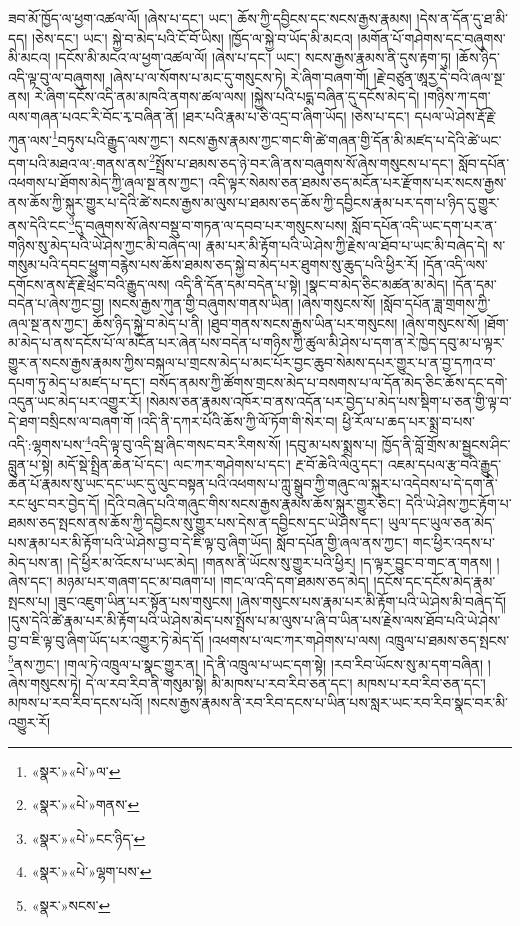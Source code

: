 ཟབ་མོ་ཁྱོད་ལ་ཕྱག་འཚལ་ལོ། །ཞེས་པ་དང་། ཡང་། ཆོས་ཀྱི་དབྱིངས་དང་སངས་རྒྱས་རྣམས། །དེས་ན་དོན་དུ་ཐ་མི་དད། །ཅེས་དང་། ཡང་། སྐྱེ་བ་མེད་པའི་ངོ་བོ་ཡིས། །ཁྱོད་ལ་སྐྱེ་བ་ཡོད་མི་མངའ། །མགོན་པོ་གཤེགས་དང་བཞུགས་མི་མངའ། །དངོས་མི་མངའ་ལ་ཕྱག་འཚལ་ལོ། །ཞེས་པ་དང་། ཡང་། སངས་རྒྱས་རྣམས་ནི་དུས་རྟག་ཏུ། །ཆོས་ཉིད་འདི་ལྟ་བུ་ལ་བཞུགས། །ཞེས་པ་ལ་སོགས་པ་མང་དུ་གསུངས་ཏེ། རེ་ཞིག་བཞག་གོ། །རྗེ་བཙུན་ཨཱརྱ་དེ་བའི་ཞལ་སྔ་ནས། རེ་ཞིག་དངོས་འདི་ནམ་མཁའི་ནགས་ཚལ་ལས། །སྐྱེས་པའི་པདྨ་བཞིན་དུ་དངོས་མེད་དེ། །གཉིས་ཀ་དག་ལས་གཞན་པའང་རི་བོང་རྭ་བཞིན་ནོ། །ཐར་པའི་རྣམ་པ་ཅི་འདྲ་བ་ཞིག་ཡོད། །ཅེས་པ་དང་། དཔལ་ཡེ་ཤེས་རྡོ་རྗེ་ཀུན་ལས་\footnote{«སྣར་»«པེ་»ལ་}བཏུས་པའི་རྒྱུད་ལས་ཀྱང་། སངས་རྒྱས་རྣམས་ཀྱང་གང་གི་ཚེ་གཞན་གྱི་དོན་མི་མཛད་པ་དེའི་ཚེ་ཡང་དག་པའི་མཐའ་ལ་:གནས་ནས་\footnote{«སྣར་»«པེ་»གནས་}སྤྲོས་པ་ཐམས་ཅད་ཉེ་བར་ཞི་ནས་བཞུགས་སོ་ཞེས་གསུངས་པ་དང་། སློབ་དཔོན་འཕགས་པ་ཐོགས་མེད་ཀྱི་ཞལ་སྔ་ནས་ཀྱང་། འདི་ལྟར་སེམས་ཅན་ཐམས་ཅད་མངོན་པར་རྫོགས་པར་སངས་རྒྱས་ནས་ཆོས་ཀྱི་སྐུར་གྱུར་པ་དེའི་ཚེ་སངས་རྒྱས་མ་ལུས་པ་ཐམས་ཅད་ཆོས་ཀྱི་དབྱིངས་རྣམ་པར་དག་པ་ཉིད་དུ་གྱུར་ནས་དེའི་ངང་\footnote{«སྣར་»«པེ་»ངང་ཉིད་}དུ་བཞུགས་སོ་ཞེས་བསྡུ་བ་གཏན་ལ་དབབ་པར་གསུངས་པས། སློབ་དཔོན་འདི་ཡང་དག་པར་ན་གཉིས་སུ་མེད་པའི་ཡེ་ཤེས་ཀྱང་མི་བཞེད་ལ། རྣམ་པར་མི་རྟོག་པའི་ཡེ་ཤེས་ཀྱི་རྗེས་ལ་ཐོབ་པ་ཡང་མི་བཞེད་དེ། ས་གསུམ་པའི་དབང་ཕྱུག་བརྙེས་པས་ཆོས་ཐམས་ཅད་སྐྱེ་བ་མེད་པར་ཐུགས་སུ་ཆུད་པའི་ཕྱིར་རོ། །དོན་འདི་ལས་དགོངས་ནས་རྡོ་རྗེ་ཕྲེང་བའི་རྒྱུད་ལས། འདི་ནི་དོན་དམ་བདེན་པ་སྟེ། །སྣང་བ་མེད་ཅིང་མཚན་མ་མེད། །དོན་དམ་བདེན་པ་ཞེས་ཀྱང་བྱ། །སངས་རྒྱས་ཀུན་གྱི་བཞུགས་གནས་ཡིན། །ཞེས་གསུངས་སོ། །སློབ་དཔོན་ཟླ་གྲགས་ཀྱི་ཞལ་སྔ་ནས་ཀྱང་། ཆོས་ཉིད་སྐྱེ་བ་མེད་པ་ནི། །ཐུབ་གནས་སངས་རྒྱས་ཡིན་པར་གསུངས། །ཞེས་གསུངས་སོ། །ཐོག་མ་མེད་པ་ནས་དངོས་པོ་ལ་མངོན་པར་ཞེན་པས་བདེན་པ་གཉིས་ཀྱི་ཚུལ་མི་ཤེས་པ་དག་ན་རེ་ཁྱེད་དབུ་མ་པ་ལྟར་གྱུར་ན་སངས་རྒྱས་རྣམས་ཀྱིས་བསྐལ་པ་གྲངས་མེད་པ་མང་པོར་བྱང་ཆུབ་སེམས་དཔར་གྱུར་པ་ན་བྱ་དཀའ་བ་དཔག་ཏུ་མེད་པ་མཛད་པ་དང་། བསོད་ནམས་ཀྱི་ཚོགས་གྲངས་མེད་པ་བསགས་པ་ལ་དོན་མེད་ཅིང་ཆོས་དང་དགེ་འདུན་ཡང་མེད་པར་འགྱུར་རོ། །སེམས་ཅན་རྣམས་འཁོར་བ་ནས་འདོན་པར་བྱེད་པ་མེད་པས་སྡིག་པ་ཅན་གྱི་ལྟ་བ་དེ་ཐག་བསྲིངས་ལ་བཞག་གོ །འདི་ནི་དཀར་པོའི་ཆོས་ཀྱི་ལོ་ཏོག་གི་སེར་བ། ཕྱི་རོལ་པ་ཆད་པར་སྨྲ་བ་པས་འདི་:ལྷགས་པས་\footnote{«སྣར་»«པེ་»ལྷག་པས་}འདི་ལྟ་བུ་འདི་སྦ་ཞིང་གསང་བར་རིགས་སོ། །དབུ་མ་པས་སྨྲས་པ། ཁྱོད་ནི་བློ་གྲོས་མ་སྦྱངས་ཤིང་བླུན་པ་སྟེ། མདོ་སྡེ་སྤྲིན་ཆེན་པོ་དང་། ལང་ཀར་གཤེགས་པ་དང་། རྔ་བོ་ཆེའི་ལེའུ་དང་། འཇམ་དཔལ་རྩ་བའི་རྒྱུད་ཆེན་པོ་རྣམས་སུ་ཡང་དང་ཡང་དུ་ལུང་བསྟན་པའི་འཕགས་པ་ཀླུ་སྒྲུབ་ཀྱི་གཞུང་ལ་སྐུར་པ་འདེབས་པ་དེ་དག་ནི་རང་ཕུང་བར་བྱེད་དོ། །དེའི་བཞེད་པའི་གཞུང་གིས་སངས་རྒྱས་རྣམས་ཆོས་སྐུར་གྱུར་ཅིང་། དེའི་ཡེ་ཤེས་ཀྱང་རྟོག་པ་ཐམས་ཅད་སྤངས་ནས་ཆོས་ཀྱི་དབྱིངས་སུ་གྱུར་པས་དེས་ན་དབྱིངས་དང་ཡེ་ཤེས་དང་། ཡུལ་དང་ཡུལ་ཅན་མེད་པས་རྣམ་པར་མི་རྟོག་པའི་ཡེ་ཤེས་བྱ་བ་དེ་ཇི་ལྟ་བུ་ཞིག་ཡོད། སློབ་དཔོན་གྱི་ཞལ་ནས་ཀྱང་། གང་ཕྱིར་འདས་པ་མེད་པས་ན། །དེ་ཕྱིར་མ་འོངས་པ་ཡང་མེད། །གནས་ནི་ཡོངས་སུ་གྱུར་པའི་ཕྱིར། །ད་ལྟར་བྱུང་བ་གང་ན་གནས། །ཞེས་དང་། མཉམ་པར་གཞག་དང་མ་བཞག་པ། །གང་ལ་འདི་དག་ཐམས་ཅད་མེད། །དངོས་དང་དངོས་མེད་རྣམ་སྤངས་པ། །ཟུང་འཇུག་ཡིན་པར་སྟོན་པས་གསུངས། །ཞེས་གསུངས་པས་རྣམ་པར་མི་རྟོག་པའི་ཡེ་ཤེས་མི་བཞེད་དོ། །དུས་དེའི་ཚེ་རྣམ་པར་མི་རྟོག་པའི་ཡེ་ཤེས་མེད་པས་སྤྲོས་པ་མ་ལུས་པ་ཞི་བ་ཡིན་པས་རྗེས་ལས་ཐོབ་པའི་ཡེ་ཤེས་བྱ་བ་ཇི་ལྟ་བུ་ཞིག་ཡོད་པར་འགྱུར་ཏེ་མེད་དོ། །འཕགས་པ་ལང་ཀར་གཤེགས་པ་ལས། འཁྲུལ་པ་ཐམས་ཅད་སྤངས་\footnote{«སྣར་»སངས་}ནས་ཀྱང་། །གལ་ཏེ་འཁྲུལ་པ་སྣང་གྱུར་ན། །དེ་ནི་འཁྲུལ་པ་ཡང་དག་སྟེ། །རབ་རིབ་ཡོངས་སུ་མ་དག་བཞིན། །ཞེས་གསུངས་ཏེ། དེ་ལ་རབ་རིབ་ནི་གསུམ་སྟེ། མི་མཁས་པ་རབ་རིབ་ཅན་དང་། མཁས་པ་རབ་རིབ་ཅན་དང་། མཁས་པ་རབ་རིབ་དངས་པའོ། །སངས་རྒྱས་རྣམས་ནི་རབ་རིབ་དངས་པ་ཡིན་པས་སླར་ཡང་རབ་རིབ་སྣང་བར་མི་འགྱུར་རོ། 